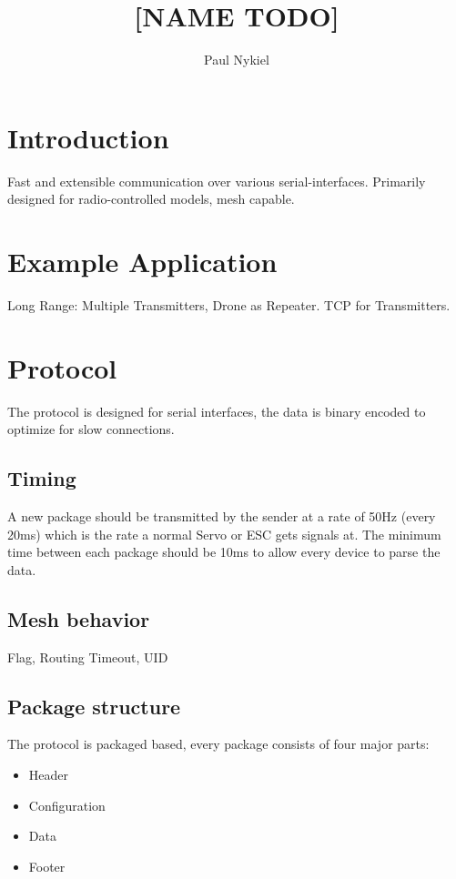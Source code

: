 \documentclass{article}
\title{[NAME TODO]}
\author{Paul Nykiel}
\begin{document}
\maketitle
\tableofcontents

\section{Introduction}
  Fast and extensible communication over various serial-interfaces. Primarily
  designed for radio-controlled models, mesh capable.

\section{Example Application}
  Long Range: Multiple Transmitters, Drone as Repeater. TCP for Transmitters.

\section{Protocol}
  The protocol is designed for serial interfaces, the data is binary encoded to
  optimize for slow connections.

  \subsection{Timing}
    A new package should be transmitted by the sender at a rate of 50Hz (every
    20ms) which is the rate a normal Servo or ESC gets signals at. The minimum
    time between each package should be 10ms to allow every device to parse the
    data.

  \subsection{Mesh behavior}
    Flag, Routing Timeout, UID

  \subsection{Package structure}
    The protocol is packaged based, every package
    consists of four major parts:
    \begin{itemize}
      \item Header
      \item Configuration
      \item Data
      \item Footer
    \end{itemize}
\end{document}
